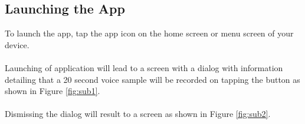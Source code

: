 \documentclass[letterpaper, 12 pt]{report}
\begin{document}
\newpage

\subsection{Launching the App}
To launch the app, tap the app icon on the home screen or menu screen of your  device.\\ \\
Launching of application will lead to a screen with a dialog with information detailing that a 20 second voice sample will be recorded on tapping the button as shown in Figure  \ref{fig:sub1}.\\ \\
Dismissing the dialog will result to a screen as shown in Figure \ref{fig:sub2}.\\ \\ \\ 
\end{document}
